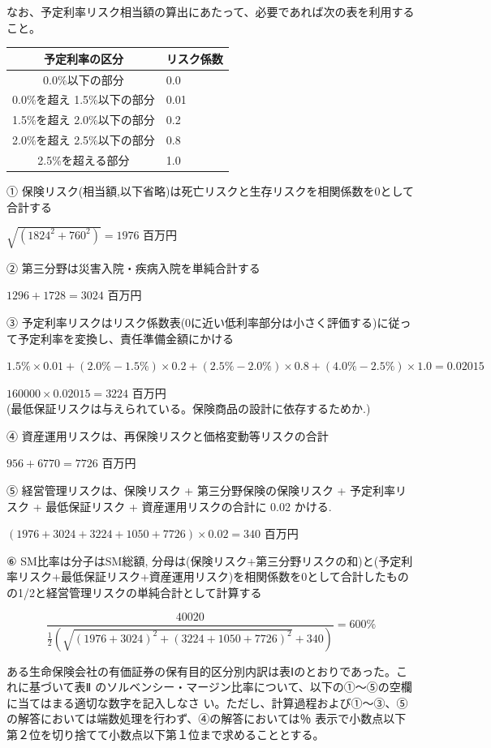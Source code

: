 \documentclass[report,gutter=10mm,fore-edge=10mm,uplatex,dvipdfmx]{jlreq}
\begin{document}
なお、予定利率リスク相当額の算出にあたって、必要であれば次の表を利用すること。

\begin{tabular}{|c|l|}
 \hline
予定利率の区分& リスク係数\\ \hline
  0.0\%以下の部分& 0.0\\ \hline
  0.0\%を超え 1.5\%以下の部分& 0.01\\ \hline
  1.5\%を超え 2.0\%以下の部分& 0.2\\ \hline
  2.0\%を超え 2.5\%以下の部分& 0.8\\ \hline
  2.5\%を超える部分& 1.0\\ \hline
\end{tabular}

\answer{}
①  保険リスク(相当額,以下省略)は死亡リスクと生存リスクを相関係数を0として合計する\par
$\sqrt{(1824^2+760^2)}=1976$ 百万円 

② 第三分野は災害入院・疾病入院を単純合計する\par
$1296+1728=3024$ 百万円 

③ 予定利率リスクはリスク係数表(0に近い低利率部分は小さく評価する)に従って予定利率を変換し、責任準備金額にかける\par
$1.5\%\times 0.01+(2.0\% -1.5\%)\times 0.2+(2.5\% - 2.0\%)\times 0.8+(4.0\%-2.5\%)\times 1.0 = 0.02015$\par
$160000\times 0.02015=3224$ 百万円 
\\[1zh]
(最低保証リスクは与えられている。保険商品の設計に依存するためか.)

④ 資産運用リスクは、再保険リスクと価格変動等リスクの合計\par
$956+6770=7726$ 百万円 

⑤ 経営管理リスクは、保険リスク + 第三分野保険の保険リスク + 予定利率リスク + 最低保証リスク + 資産運用リスクの合計に 0.02 かける.\par
$(1976+3024+3224+1050+7726)\times 0.02 = 340$ 百万円 

⑥ SM比率は分子はSM総額, 分母は(保険リスク+第三分野リスクの和)と(予定利率リスク+最低保証リスク+資産運用リスク)を相関係数を0として合計したものの1/2と経営管理リスクの単純合計として計算する\par
$$
\frac{40020}{\frac{1}{2}(\sqrt{(1976+3024)^2+(3224+1050+7726)^2}+340)}=600\%
$$


ある生命保険会社の有価証券の保有目的区分別内訳は表Ⅰのとおりであった。これに基づいて表Ⅱ
のソルベンシー・マージン比率について、以下の①〜⑤の空欄に当てはまる適切な数字を記入しなさ
い。ただし、計算過程および①〜③、⑤の解答においては端数処理を行わず、④の解答においては％
表示で小数点以下第２位を切り捨てて小数点以下第１位まで求めることとする。
\end{document}
